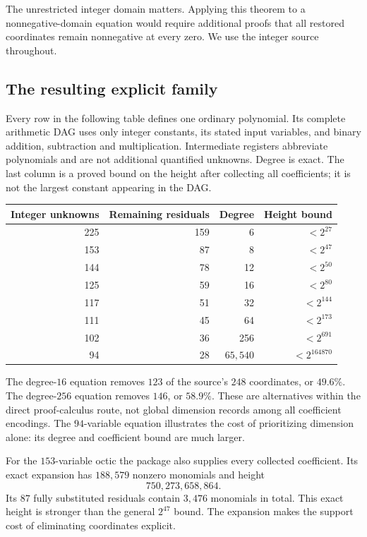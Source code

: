 The unrestricted integer domain matters.  Applying this theorem to a
nonnegative-domain equation would require additional proofs that all
restored coordinates remain nonnegative at every zero.  We use the
integer source throughout.

\subsection{The resulting explicit family}

Every row in the following table defines one ordinary polynomial.  Its
complete arithmetic DAG uses only integer constants, its stated input
variables, and binary addition, subtraction and multiplication.
Intermediate registers abbreviate polynomials and are not additional
quantified unknowns.  Degree is exact.  The last column is a proved bound
on the height after collecting all coefficients; it is not the largest
constant appearing in the DAG.

\begin{center}
\begin{tabular}{rrrr}
\hline
Integer unknowns & Remaining residuals & Degree & Height bound \\
\hline
225 & 159 & 6 & $<2^{27}$ \\
153 & 87 & 8 & $<2^{47}$ \\
144 & 78 & 12 & $<2^{50}$ \\
125 & 59 & 16 & $<2^{80}$ \\
117 & 51 & 32 & $<2^{144}$ \\
111 & 45 & 64 & $<2^{173}$ \\
102 & 36 & 256 & $<2^{691}$ \\
94 & 28 & $65{,}540$ & $<2^{164870}$ \\
\hline
\end{tabular}
\end{center}

The degree-$16$ equation removes $123$ of the source's $248$ coordinates,
or $49.6\%$.  The degree-$256$ equation removes $146$, or $58.9\%$.
These are alternatives within the direct proof-calculus route, not
global dimension records among all coefficient encodings.  The
$94$-variable equation illustrates the cost of prioritizing dimension
alone: its degree and coefficient bound are much larger.

For the $153$-variable octic the package also supplies every collected
coefficient.  Its exact expansion has $188{,}579$ nonzero monomials and
height
\[
 750{,}273{,}658{,}864.
\]
Its $87$ fully substituted residuals contain $3{,}476$ monomials in total.
This exact height is stronger than the general $2^{47}$ bound.  The
expansion makes the support cost of eliminating coordinates explicit.

